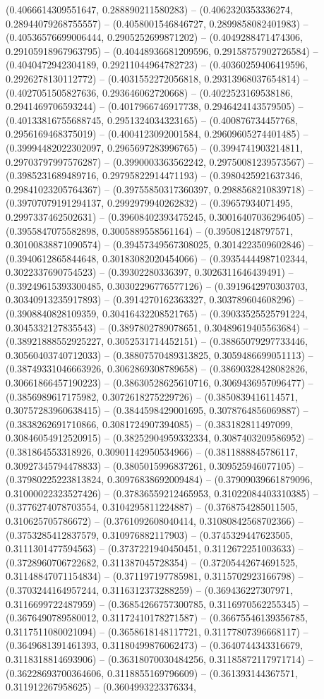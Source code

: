 (0.4066614309551647, 0.288890211580283) -- (0.4062320353336274, 0.28944079268755557) -- (0.4058001546846727, 0.2899858082401983) -- (0.40536576699006444, 0.2905252699871202) -- (0.4049288471474306, 0.29105918967963795) -- (0.40448936681209596, 0.29158757902726584) -- (0.4040472942304189, 0.29211044964782723) -- (0.40360259406419596, 0.2926278130112772) -- (0.4031552272056818, 0.29313968037654814) -- (0.4027051505827636, 0.293646062720668) -- (0.4022523169538186, 0.2941469706593244) -- (0.4017966746917738, 0.2946424143579505) -- (0.40133816755688745, 0.2951324034323165) -- (0.400876734457768, 0.2956169468375019) -- (0.4004123092001584, 0.29609605274401485) -- (0.39994482022302097, 0.2965697283996765) -- (0.3994741903214811, 0.29703797997576287) -- (0.3990003363562242, 0.29750081239573567) -- (0.3985231689489716, 0.29795822914471193) -- (0.3980425921637346, 0.29841023205764367) -- (0.39755850317360397, 0.2988568210839718) -- (0.39707079191294137, 0.2992979940262832) -- (0.39657934071495, 0.2997337462502631) -- (0.39608402393475245, 0.30016407036296405) -- (0.3955847075582898, 0.3005889558561164) -- (0.395081248797571, 0.30100838871090574) -- (0.39457349567308025, 0.3014223509602846) -- (0.3940612865844648, 0.30183082020454066) -- (0.39354444987102344, 0.3022337690754523) -- (0.39302280336397, 0.3026311646439491) -- (0.39249615393300485, 0.30302296776577126) -- (0.3919642970303703, 0.30340913235917893) -- (0.3914270162363327, 0.303789604608296) -- (0.3908840828109359, 0.30416432208521765) -- (0.39033525525791224, 0.3045332127835543) -- (0.3897802789078651, 0.30489619405563684) -- (0.38921888552925227, 0.3052531714452151) -- (0.38865079297733446, 0.30560403740712033) -- (0.38807570489313825, 0.3059486699051113) -- (0.38749331046663926, 0.3062869308789658) -- (0.38690328428082826, 0.30661866457190223) -- (0.38630528625610716, 0.3069436957096477) -- (0.3856989617175982, 0.3072618275229726) -- (0.3850839416114571, 0.30757283960638415) -- (0.3844598429001695, 0.3078764856069887) -- (0.3838262691710866, 0.3081724907394085) -- (0.383182811497099, 0.30846054912520915) -- (0.38252904959332334, 0.3087403209586952) -- (0.381864553318926, 0.30901142950534966) -- (0.3811888845786117, 0.30927345794478833) -- (0.3805015996837261, 0.309525946077105) -- (0.37980225223813824, 0.30976838692009484) -- (0.37909039661879096, 0.31000022323527426) -- (0.37836559212465953, 0.31022084403310385) -- (0.3776274078703554, 0.3104295811224887) -- (0.3768754285011505, 0.310625705786672) -- (0.3761092608040414, 0.31080842568702366) -- (0.3753285412837579, 0.310976882117903) -- (0.3745329447623505, 0.3111301477594563) -- (0.3737221940450451, 0.3112672251003633) -- (0.3728960706722682, 0.311387045728354) -- (0.37205442674691525, 0.31148847071154834) -- (0.371197197785981, 0.3115702923166798) -- (0.3703244164957244, 0.3116312373288259) -- (0.369436227307971, 0.3116699722487959) -- (0.36854266757300785, 0.3116970562255345) -- (0.3676490789580012, 0.31172410178271587) -- (0.36675546139356785, 0.3117511080021094) -- (0.3658618148117721, 0.31177807396668117) -- (0.3649681391461393, 0.31180499876062473) -- (0.3640744343316679, 0.3118318814693906) -- (0.36318070030484256, 0.31185872117971714) -- (0.36228693700364606, 0.3118855169796609) -- (0.361393144367571, 0.311912267958625) -- (0.3604993223376334, 
